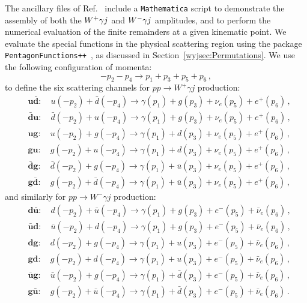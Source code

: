\documentclass[main.tex]{subfiles}
\begin{document}
The ancillary files of Ref.~\cite{Badger:2022ncb} include a \texttt{Mathematica} script to demonstrate the assembly of both the $W^+\gamma j$ and $W^-\gamma j$ amplitudes, and to perform the numerical evaluation of the finite remainders at a given kinematic point. We evaluate the special functions in the physical scattering region using the package \texttt{PentagonFunctions++}~\cite{Chicherin:2021dyp}, as discussed in Section~\ref{wyjsec:Permutations}. We use the following configuration of momenta:
\begin{equation}
-p_2 - p_4 \to p_1 + p_3 + p_5 + p_6 \,,
\label{Wyjeq:momconfig}
\end{equation}
to define the six scattering channels for $pp\to W^+\gamma j$ production:
\begin{equation}
\label{Wyjeq:wplus_channel_definition}
\begin{aligned}
&\mathbf{u\bar{d}}: \quad  u(-p_2) + \bar{d}(-p_4) \to \gamma(p_1) + g(p_3) + \nu_e(p_5) + e^+(p_6) \,, \\
&\mathbf{\bar{d}u}: \quad  \bar{d}(-p_2) + u(-p_4) \to \gamma(p_1) + g(p_3) + \nu_e(p_5) + e^+(p_6) \,, \\
&\mathbf{ug}:       \quad  u(-p_2) + g(-p_4)       \to \gamma(p_1) + d(p_3) + \nu_e(p_5) + e^+(p_6) \,, \\
&\mathbf{gu}:       \quad  g(-p_2) + u(-p_4)       \to \gamma(p_1) + d(p_3) + \nu_e(p_5) + e^+(p_6) \,, \\
&\mathbf{\bar{d}g}: \quad  \bar{d}(-p_2) + g(-p_4) \to \gamma(p_1) + \bar{u}(p_3) + \nu_e(p_5) + e^+(p_6) \,, \\
&\mathbf{g\bar{d}}: \quad  g(-p_2) + \bar{d}(-p_4) \to \gamma(p_1) + \bar{u}(p_3) + \nu_e(p_5) + e^+(p_6) \,,
\end{aligned}
\end{equation}
and similarly for $pp\to W^-\gamma j$ production:
\begin{equation}
\label{Wyjeq:wmin_channel_definition}
\begin{aligned}
&\mathbf{d\bar{u}}: \quad  d(-p_2) + \bar{u}(-p_4) \to \gamma(p_1) + g(p_3)       + e^-(p_5) + \bar\nu_e(p_6) \,, \\
&\mathbf{\bar{u}d}: \quad  \bar{u}(-p_2) + d(-p_4) \to \gamma(p_1) + g(p_3)       + e^-(p_5) + \bar\nu_e(p_6) \,, \\
&\mathbf{dg}:       \quad  d(-p_2) + g(-p_4)       \to \gamma(p_1) + u(p_3)       + e^-(p_5) + \bar\nu_e(p_6) \,, \\
&\mathbf{gd}:       \quad  g(-p_2) + d(-p_4)       \to \gamma(p_1) + u(p_3)       + e^-(p_5) + \bar\nu_e(p_6) \,, \\
&\mathbf{\bar{u}g}: \quad  \bar{u}(-p_2) + g(-p_4) \to \gamma(p_1) + \bar{d}(p_3) + e^-(p_5) + \bar\nu_e(p_6) \,, \\
&\mathbf{g\bar{u}}: \quad  g(-p_2) + \bar{u}(-p_4) \to \gamma(p_1) + \bar{d}(p_3) + e^-(p_5) + \bar\nu_e(p_6) \,.
\end{aligned}
\end{equation}
\end{document}
